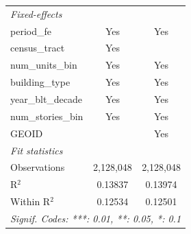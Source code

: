 \begin{tabular}{lcc}
   \midrule
   \emph{Fixed-effects}\\
   period\_fe                                                          & Yes                    & Yes\\  
   census\_tract                                                       & Yes                    & \\  
   num\_units\_bin                                                     & Yes                    & Yes\\  
   building\_type                                                      & Yes                    & Yes\\  
   year\_blt\_decade                                                   & Yes                    & Yes\\  
   num\_stories\_bin                                                   & Yes                    & Yes\\  
   GEOID                                                               &                        & Yes\\  
   \midrule
   \emph{Fit statistics}\\
   Observations                                                        & 2,128,048              & 2,128,048\\  
   R$^2$                                                               & 0.13837                & 0.13974\\  
   Within R$^2$                                                        & 0.12534                & 0.12501\\  
   \midrule \midrule
   \multicolumn{3}{l}{\emph{Signif. Codes: ***: 0.01, **: 0.05, *: 0.1}}\\
\end{tabular}
\par\endgroup
\begingroup
\centering
